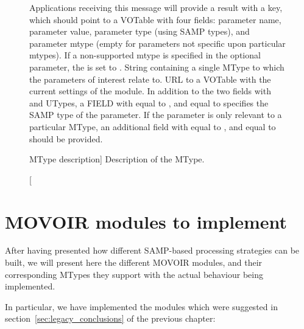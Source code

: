 		\begin{figure}[tbp]
			\centering
			\begin{minipage}{0.9\textwidth}
			\begin{framed}
					{
					Applications receiving this message will
					provide a result with a  key, which
					should point to a VOTable with four fields:
					parameter name, parameter value, parameter type
					(using SAMP types), and parameter mtype (empty
					for parameters not specific upon particular
					mtypes). If a non-supported mtype is specified
					in the optional  parameter, the
					\sampstatus{} is set to \sampwarning{}.
					}
					{
						{String containing a single MType to which
						the parameters of interest relate to.}
					}
					{
						{
						URL to a VOTable with the current settings
						of the module. In addition to the two
						fields with 
						and  UTypes,
						a FIELD with  equal to
						, and  equal to
						 specifies
						the SAMP type of the parameter. If the
						parameter is only relevant to a particular
						MType, an additional field with
						 equal to , and
						 equal to 
						should be provided.
						}
					}
		
			\end{framed}
			\end{minipage}
			\caption
			[ MType description]
			{Description of the 
			MType.}
			\label{fig:movoirConfigurationGetMtype}
		\end{figure}
		
	
	\section{MOVOIR modules to implement} %
	\label{sec:movoir_modules}
		
		After having presented how different SAMP-based processing
		strategies can be built, we will present here the different
		MOVOIR modules, and their corresponding MTypes they support
		with the actual behaviour being implemented.
		
		In particular, we have implemented the modules which were
		suggested in section~\ref{sec:legacy_conclusions} of the
		previous chapter:
		
